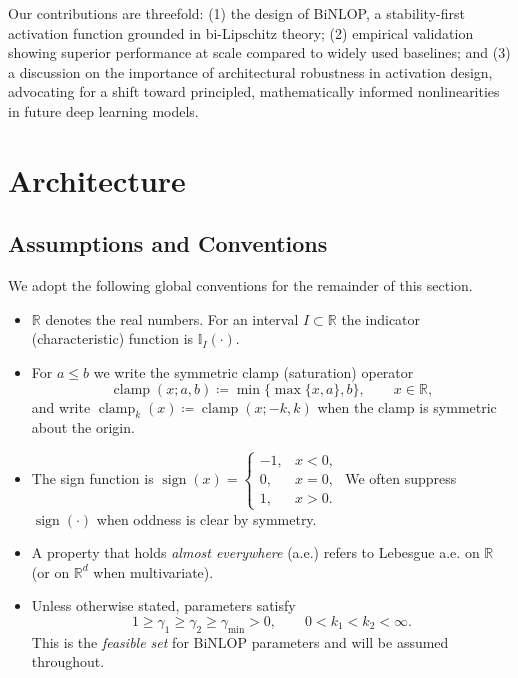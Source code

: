 \documentclass[11pt, twoside, openright, english]{article}
\DeclareMathOperator{\clamp}{clamp}
\DeclareMathOperator{\sign}{sign}
\newcommand{\I}{\mathbb{I}}
\newcommand{\R}{\mathbb{R}}
\numberwithin{equation}{section}
\theoremstyle{plain}
\theoremstyle{definition}
\theoremstyle{remark}
\begin{document}
Our contributions are threefold: (1) the design of BiNLOP, a stability-first activation function grounded in bi-Lipschitz theory; (2) empirical validation showing superior performance at scale compared to widely used baselines; and (3) a discussion on the importance of architectural robustness in activation design, advocating for a shift toward principled, mathematically informed nonlinearities in future deep learning models.


\section{Architecture}
\label{sec:architecture}

\subsection{Assumptions and Conventions}
We adopt the following global conventions for the remainder of this section.

\begin{itemize}
  \item $\R$ denotes the real numbers. For an interval $I\subset\R$ the indicator (characteristic) function is $\I_{I}(\cdot)$.
  \item For $a\le b$ we write the symmetric clamp (saturation) operator
  \[
    \clamp(x; a,b) \coloneqq \min\{\max\{x,a\},b\},\qquad x\in\R,
  \]
  and write $\clamp_k(x)\coloneqq \clamp(x;-k,k)$ when the clamp is symmetric about the origin.
  \item The sign function is $\sign(x)=\begin{cases}-1,&x<0,\\0,&x=0,\\1,&x>0.\end{cases}$ We often suppress $\sign(\cdot)$ when oddness is clear by symmetry.
  \item A property that holds \emph{almost everywhere} (a.e.) refers to Lebesgue a.e. on $\R$ (or on $\R^d$ when multivariate).
  \item Unless otherwise stated, parameters satisfy
  \[
    1 \ge \gamma_1 \ge \gamma_2 \ge \gamma_{\min} > 0,\qquad 0<k_1<k_2<\infty.
  \]
  This is the \emph{feasible set} for BiNLOP parameters and will be assumed throughout.
\end{itemize}
\end{document}
